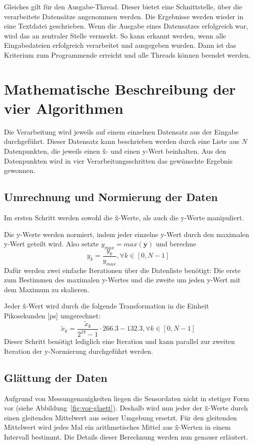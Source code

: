 Gleiches gilt für den Ausgabe-Thread.
Dieser bietet eine Schnittstelle, über die verarbeitete Datensätze angenommen werden.
Die Ergebnisse werden wieder in eine Textdatei geschrieben.
Wenn die Ausgabe eines Datensatzes erfolgreich war, wird das an zentraler Stelle vermerkt.
So kann erkannt werden, wenn alle Eingabedateien erfolgreich verarbeitet und ausgegeben wurden.
Dann ist das Kriterium zum Programmende erreicht und alle Threads können beendet werden.

\section{Mathematische Beschreibung der vier Algorithmen}\label{sec:mat-beschreibung}
Die Verarbeitung wird jeweils auf einem einzelnen Datensatz aus der Eingabe durchgeführt.
Dieser Datensatz kann beschrieben werden durch eine Liste aus $N$ Datenpunkten, die jeweils einen \~x- und einen y-Wert beinhalten.
Aus den Datenpunkten wird in vier Verarbeitungsschritten das gewünschte Ergebnis gewonnen.

\subsection{Umrechnung und Normierung der Daten}\label{subsec:umrechnung-und-normierung}
Im ersten Schritt werden sowohl die \~x-Werte, als auch die y-Werte manipuliert.

Die y-Werte werden normiert, indem jeder einzelne y-Wert durch den maximalen y-Wert geteilt wird.
Also setzte $y_{max} = max(\bm{y})$ und berechne
\[
    y_k = \frac{y_k}{y_{max}}, \forall k \in [0, N - 1]
\]
Dafür werden zwei einfache Iterationen über die Datenliste benötigt:
Die erste zum Bestimmen des maximalen y-Wertes und die zweite um jeden y-Wert mit dem Maximum zu skalieren.

Jeder \~x-Wert wird durch die folgende Transformation in die Einheit Pikosekunden [ps] umgerechnet:
\[
    \tilde{x}_k = \frac{\tilde{x}_k}{2^{18} - 1} \cdot 266.3 - 132.3, \forall k \in [0, N - 1]
\]
Dieser Schritt benötigt lediglich eine Iteration und kann parallel zur zweiten Iteration der y-Normierung durchgeführt werden.

\subsection{Glättung der Daten}\label{subsec:glaettung}
Aufgrund von Messungenauigkeiten liegen die Sensordaten nicht in stetiger Form vor (siehe Abbildung~\ref{fig:vor-glaett}).
Deshalb wird nun jeder der \~x-Werte durch einen gleitenden Mittelwert aus seiner Umgebung ersetzt.
Für den gleitenden Mittelwert wird jedes Mal ein arithmetisches Mittel aus \~x-Werten in einem Intervall bestimmt.
Die Details dieser Berechnung werden nun genauer erläutert.

